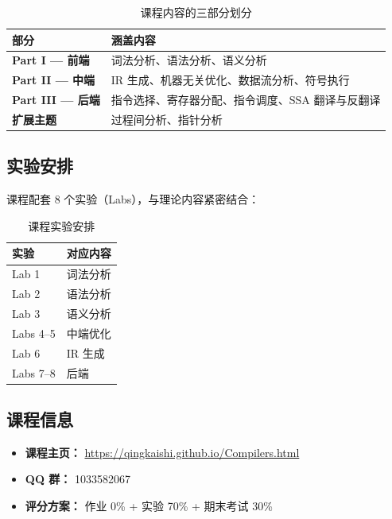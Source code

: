 \documentclass[12pt,a4paper]{ctexart}
\begin{document}
\begin{table}[h]
\centering
\begin{tabularx}{\textwidth}{@{}lX@{}}
\toprule
\textbf{部分} & \textbf{涵盖内容} \\
\midrule
\textbf{Part I — 前端} & 词法分析、语法分析、语义分析 \\
\textbf{Part II — 中端} & IR 生成、机器无关优化、数据流分析、符号执行 \\
\textbf{Part III — 后端} & 指令选择、寄存器分配、指令调度、SSA 翻译与反翻译 \\
\textbf{扩展主题} & 过程间分析、指针分析 \\
\bottomrule
\end{tabularx}
\caption{课程内容的三部分划分}
\end{table}

\subsection{实验安排}

课程配套 8 个实验（Labs），与理论内容紧密结合：

\begin{table}[h]
\centering
\begin{tabularx}{\textwidth}{@{}lX@{}}
\toprule
\textbf{实验} & \textbf{对应内容} \\
\midrule
Lab 1 & 词法分析 \\
Lab 2 & 语法分析 \\
Lab 3 & 语义分析 \\
Labs 4–5 & 中端优化 \\
Lab 6 & IR 生成 \\
Labs 7–8 & 后端 \\
\bottomrule
\end{tabularx}
\caption{课程实验安排}
\end{table}

\subsection{课程信息}

\begin{itemize}[itemsep=0.2em]
  \item \textbf{课程主页：} \url{https://qingkaishi.github.io/Compilers.html}
  \item \textbf{QQ 群：} 1033582067
  \item \textbf{评分方案：} 作业 0\% + 实验 70\% + 期末考试 30\%
\end{itemize}
\end{document}
